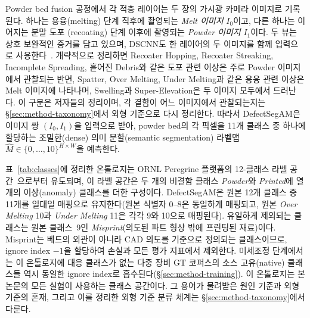 Powder bed fusion 공정에서 각 적층 레이어는 두 장의 가시광 카메라
이미지로 기록된다. 하나는 용융(melting) 단계 직후에 촬영되는
\emph{Melt 이미지} $I_0$이고, 다른 하나는 이어지는 분말 도포
(recoating) 단계 이후에 촬영되는 \emph{Powder 이미지} $I_1$이다. 두
뷰는 상호 보완적인 증거를 담고 있으며, DSCNN도 한 레이어의 두 이미지를
함께 입력으로 사용한다~\cite{Scime2020DSCNN}. 개략적으로 정리하면 Recoater
Hopping, Recoater Streaking, Incomplete Spreading, 흩어진 Debris와 같은
도포 관련 이상은 주로 Powder 이미지에서 관찰되는 반면, Spatter, Over
Melting, Under Melting과 같은 용융 관련 이상은 Melt 이미지에 나타나며,
Swelling과 Super-Elevation은 두 이미지 모두에서 드러난다. 이 구분은
저자들의 정리이며, 각 결함이 어느 이미지에서 관찰되는지는
\S\ref{sec:method-taxonomy}에서 외형 기준으로 다시 정리한다. 따라서
DefectSegAM은 이미지 쌍 $(I_0, I_1)$을 입력으로 받아, powder bed의 각
픽셀을 11개 클래스 중 하나에 할당하는 조밀한(dense) 의미 분할(semantic segmentation) 라벨맵
$\hat{M} \in \{0,\dots,10\}^{H \times W}$을 예측한다.

표~\ref{tab:classes}에 정리한 온톨로지는 ORNL Peregrine 플랫폼의
12-클래스 라벨 공간~\cite{Scime2020DSCNN,ORNL_CoRegistered_Dataset}으로부터 유도되며, 이
라벨 공간은 두 개의 비결함 클래스 \emph{Powder}와 \emph{Printed}에 열
개의 이상(anomaly) 클래스를 더한 구성이다. DefectSegAM은 원본 12개
클래스 중 11개를 일대일 매핑으로 유지한다(원본 식별자 0--8은 동일하게
매핑되고, 원본 \emph{Over Melting} 10과 \emph{Under Melting} 11은 각각
9와 10으로 매핑된다). 유일하게 제외되는 클래스는 원본 클래스~9인
\emph{Misprint}(의도된 파트 형상 밖에 프린팅된 재료)이다. Misprint는
베드의 외관이 아니라 CAD 의도를 기준으로 정의되는 클래스이므로,
ignore index $-1$을 할당하여 손실과 모든 평가 지표에서 제외한다.
미세조정 단계에서는 이 온톨로지에 대응 클래스가 없는 다중 장비 GT
코퍼스의 소스 고유(native) 클래스들 역시 동일한 ignore index로
흡수된다(\S\ref{sec:method-training}). 이 온톨로지는 본 논문의 모든
실험이 사용하는 클래스 공간이다. 그 용어가 물려받은 원인 기준과 외형
기준의 혼재, 그리고 이를 정리한 외형 기준 분류 체계는
\S\ref{sec:method-taxonomy}에서 다룬다.

